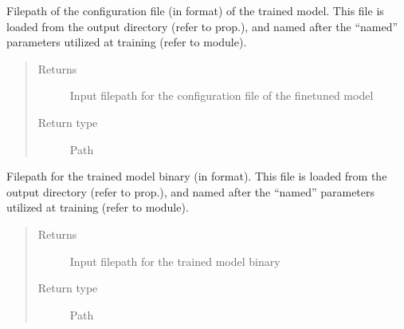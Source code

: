 \documentclass[letterpaper,10pt,english]{sphinxmanual}
\begin{document}
\begin{fulllineitems}
\begin{fulllineitems}
\label{\detokenize{code:gpt2_summarizer_inference.InferenceGPT2Summarizer._config_file}}
\sphinxAtStartPar
Filepath of the configuration file (in  format) of the trained model. This file
is loaded from the output directory (refer to  prop.), and named after
the “named” parameters utilized at training (refer to  module).
\begin{quote}\begin{description}
\item[{Returns}] \leavevmode
\sphinxAtStartPar
Input filepath for the configuration file of the fine\sphinxhyphen{}tuned model

\item[{Return type}] \leavevmode
\sphinxAtStartPar
Path

\end{description}\end{quote}

\end{fulllineitems}


\begin{fulllineitems}
\label{\detokenize{code:gpt2_summarizer_inference.InferenceGPT2Summarizer._model_file}}
\sphinxAtStartPar
Filepath for the trained model binary (in  format). This file is loaded from the
output directory (refer to  prop.), and named after the “named” parameters
utilized at training (refer to  module).
\begin{quote}\begin{description}
\item[{Returns}] \leavevmode
\sphinxAtStartPar
Input filepath for the trained model binary

\item[{Return type}] \leavevmode
\sphinxAtStartPar
Path

\end{description}\end{quote}


\end{fulllineitems}
\end{fulllineitems}
\end{document}
